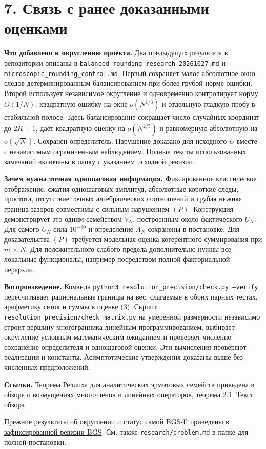 \documentclass[11pt,a4paper]{article}
\newcommand{\sect}[1]{\section*{\sffamily\color{ink}#1}}
\newcommand{\subt}[1]{\par\medskip\noindent\textbf{#1.}\quad}
\begin{document}
\newpage
\sect{7. Связь с ранее доказанными оценками}
\subt{Что добавлено к округлению проекта}
Два предыдущих результата в репозитории описаны в \texttt{balanced\_rounding\_research\_20261027.md} и \texttt{microscopic\_rounding\_control.md}. Первый сохраняет малое абсолютное окно следов детерминированным балансированием при более грубой норме ошибки. Второй использует независимое округление и одновременно контролирует норму \(O(1/N)\), квадратную ошибку на окне \(o(N^{1/3})\) и отдельную гладкую пробу в стабильной полосе. Здесь балансирование сокращает число случайных координат до \(2K+1\), даёт квадратную оценку на \(o(N^{2/5})\) и равномерную абсолютную на \(o(\sqrt N)\). Сохранён определитель. Нарушение доказано для исходного \(w\) вместе с независимым ограниченным наблюдением. Полные тексты использованных замечаний включены в папку с указанием исходной ревизии.

\subt{Зачем нужна точная одношаговая информация}
Фиксированное классическое отображение, сжатия одношаговых амплитуд, абсолютные короткие следы, простота, отсутствие точных алгебраических соотношений и грубая нижняя граница зазоров совместимы с сильным нарушением \((P)\). Конструкция демонстрирует это одним семейством \(V_N\), построенным около фактического \(U_N\). Для самого \(U_N\) сила \(10^{-80}\) и определение \(A_N\) сохранены в постановке. Для доказательства \((P)\) требуется модельная оценка когерентного суммирования при \(m\asymp N\). Для положительного слабого предела дополнительно нужны все локальные функционалы, например посредством полной факториальной иерархии.

\subt{Воспроизведение}
Команда \texttt{python3 resolution\_precision/check.py --verify} пересчитывает рациональные границы на вес, слагаемые в обоих парных тестах, арифметику сеток и суммы в оценке (3). Скрипт \texttt{resolution\_precision/check\_matrix.py} на умеренной размерности независимо строит вершину многогранника линейным программированием, выбирает округление условным математическим ожиданием и проверяет численно сохранение определителя и одношаговой оценки. Эти вычисления проверяют реализации и константы. Асимптотические утверждения доказаны выше без численных предположений.

\subt{Ссылки}
Теорема Реллиха для аналитических эрмитовых семейств приведена в обзоре о возмущениях многочленов и линейных операторов, теорема 2.1. \href{https://www.mat.univie.ac.at/~armin/publ/handbook_paper.pdf}{Текст обзора.}

Прежние результаты об округлении и статус самой BGS-F приведены в \href{https://github.com/ChurilovMaksim/BGS/tree/e2757e4cc5ef996e08190f88c93c710377c10c22}{зафиксированной ревизии BGS}. См. также \texttt{research/problem.md} в папке для полной постановки.
\end{document}
